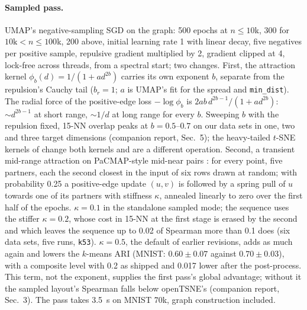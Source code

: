 \documentclass[10pt,twocolumn]{article}
\newcommand{\knn}{15-NN}
\begin{document}
\paragraph{Sampled pass.} UMAP's negative-sampling SGD \citep{mcinnes2018umap, damrich2021umap} on the graph:
500 epochs at $n \le 10$k, 300 for $10\text{k} < n \le 100$k, 200 above, initial learning rate 1 with linear decay, five
negatives per positive sample, repulsive gradient multiplied by 2, gradient clipped at 4, lock-free across
threads, from a spectral start; two changes. First, the attraction kernel
$\phi_b(d) = 1 / (1 + a d^{2b})$ carries its own exponent $b$, separate from the repulsion's Cauchy tail ($b_r =
1$; $a$ is UMAP's fit for the spread and \texttt{min\_dist}). The radial force of the positive-edge loss $-\log
\phi_b$ is $2ab\,d^{2b-1} / (1 + a d^{2b})$: $\sim d^{2b-1}$ at short range, $\sim 1/d$ at long range for every
$b$. Sweeping $b$ with the repulsion fixed, \knn{} overlap peaks at $b = 0.5$--$0.7$ on our data sets in one, two
and three target dimensions (companion report, Sec.~5); the heavy-tailed $t$-SNE kernels of \citet{kobak2019heavy}
change both kernels and are a different operation. Second, a transient mid-range attraction on PaCMAP-style mid-near pairs \citep{wang2021pacmap}: for every
point, five partners, each the second closest in the input of six rows drawn at random; with probability 0.25 a
positive-edge update $(u, v)$ is followed by a spring pull of $u$ towards one of its partners with stiffness
$\kappa$, annealed linearly to zero over the first half of the epochs. $\kappa = 0.1$ in the standalone sampled
mode; the sequence uses the stiffer $\kappa = 0.2$, whose cost in \knn{} at the first stage is erased by the
second and which leaves the sequence up to 0.02 of Spearman more than 0.1 does (six data sets, five runs,
\texttt{k53}). $\kappa = 0.5$, the default of earlier revisions, adds as much again and lowers the $k$-means ARI
(MNIST: $0.60 \pm 0.07$ against $0.70 \pm 0.03$), with a composite level with 0.2 as shipped and 0.017 lower
after the post-process. This term, not the exponent, supplies the first pass's
global advantage; without it the sampled layout's Spearman falls below openTSNE's (companion report, Sec.~3).
The pass takes 3.5~s on MNIST 70k, graph construction included.
\end{document}
